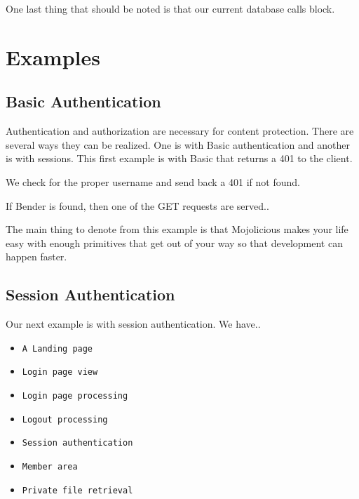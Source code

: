 \documentclass[14pt]{extreport}
\newcommand\Small{\fontsize{12}{13.0}\fontencoding{T1}\selectfont}
\newcommand*\LSTfont{\Small\ttfamily\SetTracking{encoding=*}{-60}\lsstyle}
\begin{document}


One last thing that should be noted is that our current database calls block.

\chapter*{Examples}

\section{Basic Authentication}

Authentication and authorization are necessary for content protection.  There
are several ways they can be realized.  One is with Basic authentication and
another is with sessions.  This first example is with Basic that returns a 401
to the client.



We check for the proper username and send back a 401 if not found.

If Bender is found, then one of the GET requests are served..



The main thing to denote from this example is that Mojolicious makes your life
easy with enough primitives that get out of your way so that development can happen 
faster.

\section{Session Authentication}

Our next example is with session authentication.  We have..

\begin{itemize} \itemsep1pt \parskip0pt 
\item \verb|A Landing page|
\item \verb|Login page view|
\item \verb|Login page processing|
\item \verb|Logout processing|
\item \verb|Session authentication|
\item \verb|Member area|
\item \verb|Private file retrieval|
\end{itemize}
\end{document}

